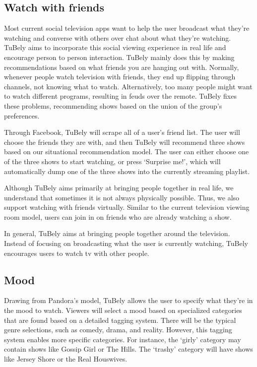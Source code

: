 \subsection{Watch with friends}
Most current social television apps want to help the user broadcast
what they’re watching and converse with others over chat about what
they’re watching.  TuBely aims to incorporate this social viewing
experience in real life and encourage person to person interaction.
TuBely mainly does this by making recommendations based on what
friends you are hanging out with.  Normally, whenever people watch
television with friends, they end up flipping through channels, not
knowing what to watch.  Alternatively, too many people might want to
watch different programs, resulting in feuds over the remote.  TuBely
fixes these problems, recommending shows based on the union of the
group’s preferences.

Through Facebook, TuBely will scrape all of a user’s friend list.  The
user will choose the friends they are with, and then TuBely will
recommend three shows based on our situational recommendation model.
The user can either choose one of the three shows to start watching,
or press ‘Surprise me!’, which will automatically dump one of the
three shows into the currently streaming playlist.

Although TuBely aims primarily at bringing people together in real
life, we understand that sometimes it is not always physically
possible.  Thus, we also support watching with friends virtually.
Similar to the current television viewing room model, users can join
in on friends who are already watching a show.

In general, TuBely aims at bringing people together around the
television.  Instead of focusing on broadcasting what the user is
currently watching, TuBely encourages users to watch tv with other
people.

\subsection{Mood}
Drawing from Pandora’s model, TuBely allows the user to specify what
they’re in the mood to watch.  Viewers will select a mood based on
specialized categories that are found based on a detailed tagging
system.  There will be the typical genre selections, such as comedy,
drama, and reality.  However, this tagging system enables more
specific categories.  For instance, the ‘girly’ category may contain
shows like Gossip Girl or The Hills.  The ‘trashy’ category will have
shows like Jersey Shore or the Real Houswives.

